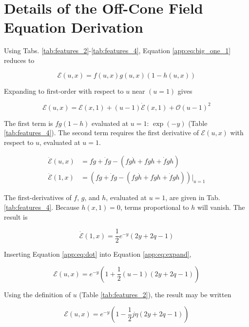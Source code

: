 \documentclass[amsmath,amssymb,aps,prd,10pt,twocolumn]{revtex4}
\begin{document}
\section{Details of the Off-Cone Field Equation Derivation}
\label{app:b}

Using Tabs. \ref{tab:features_2}-\ref{tab:features_4}, Equation \ref{app:eq:big_one_1} reduces to

\begin{equation}
\mathcal{E}(u,x) = f(u,x)g(u,x)(1-h(u,x))
\end{equation}

Expanding to first-order with respect to $u$ near $(u = 1)$ gives

\begin{equation}
\mathcal{E}(u,x) = \mathcal{E}(x,1) + (u-1) \dot{\mathcal{E}}(x,1) + \mathcal{O}(u-1)^2 \label{app:eq:expand}
\end{equation}

The first term is $fg(1-h)$ evaluated at $u = 1$: $\exp(-y)$ (Table \ref{tab:features_4}).  The second term requires the first derivative of $\mathcal{E}(u,x)$ with respect to $u$, evaluated at $u = 1$.

\begin{align}
\dot{\mathcal{E}}(u,x) &= f\dot{g} + \dot{f} g - (f g \dot{h} + f\dot{g} h + \dot{f} g h) \\
\dot{\mathcal{E}}(1,x) &= \left(f\dot{g} + \dot{f} g - (f g \dot{h} + f\dot{g} h + \dot{f} g h)\right)|_{u=1}
\end{align}

The first-derivatives of $f$, $g$, and $h$, evaluated at $u = 1$, are given in Tab. \ref{tab:features_4}.  Because $h(x,1) = 0$, terms proportional to $h$ will vanish.  The result is

\begin{equation}
\dot{\mathcal{E}}(1,x) = \frac{1}{2} e^{-y} \left(2 y + 2q - 1\right) \label{app:eq:dot}
\end{equation}

Inserting Equation \ref{app:eq:dot} into Equation \ref{app:eq:expand},

\begin{equation}
\mathcal{E}(u,x) = e^{-y} \left( 1 + \frac{1}{2} (u-1)\left(  2 y + 2q - 1 \right) \right)
\end{equation}

Using the definition of $u$ (Table \ref{tab:features_2}), the result may be written

\begin{equation}
\mathcal{E}(u,x) = e^{-y} \left( 1 - \frac{1}{2} j\eta\left( 2y + 2q - 1 \right) \right)
\end{equation}
\end{document}

